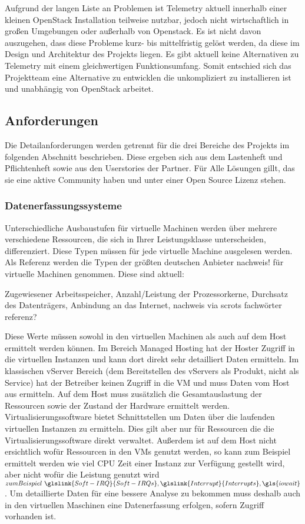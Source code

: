 Aufgrund der langen Liste an Problemen ist Telemetry aktuell innerhalb einer
kleinen OpenStack Installation teilweise nutzbar, jedoch nicht wirtschaftlich
in großen Umgebungen oder außerhalb von Openstack. Es ist nicht davon
auszugehen, dass diese Probleme kurz- bis mittelfristig gelöst werden, da diese
im Design und Architektur des Projekts liegen. Es gibt aktuell keine
Alternativen zu Telemetry mit einem gleichwertigen Funktionsumfang. Somit
entschied sich das Projektteam eine Alternative zu entwicklen die unkompliziert
zu installieren ist und unabhängig von OpenStack arbeitet.
\tm%

\subsection{Anforderungen}
Die Detailanforderungen werden getrennt für die drei Bereiche des Projekts im
folgenden Abschnitt beschrieben. Diese ergeben sich aus dem Lastenheft und
Pflichtenheft sowie aus den Userstories der Partner. Für Alle Lösungen gillt,
das sie eine aktive Community haben und unter einer Open Source Lizenz stehen.
\tm%

\subsubsection{Datenerfassungssysteme}
\label{subsubsection:datenerfassungssysteme}
Unterschiedliche Ausbaustufen für virtuelle Machinen werden über mehrere
verschiedene Ressourcen, die sich in Ihrer Leistungsklasse unterscheiden,
differenziert. Diese Typen müssen für jede virtuelle Machine ausgelesen werden.
Als Referenz werden die Typen der größten deutschen Anbieter nachweis! für
virtuelle Machinen genommen. Diese sind aktuell:

Zugewiesener Arbeitsspeicher, Anzahl/Leistung der Prozessorkerne, Durchsatz des
Datenträgers, Anbindung an das Internet, nachweis via scrots fachwörter
referenz?

Diese Werte müssen sowohl in den virtuellen Machinen als auch auf dem Host
ermittelt werden können. Im Bereich Managed Hosting hat der Hoster Zugriff in
die virtuellen Instanzen und kann dort direkt sehr detailliert Daten ermitteln.
Im klassischen vServer Bereich (dem Bereitstellen des vServers als Produkt,
nicht als Service) hat der Betreiber keinen Zugriff in die VM und muss Daten
vom Host aus ermitteln. Auf dem Host muss zusätzlich die Gesamtauslastung der
Ressourcen sowie der Zustand der Hardware ermittelt werden.
Virtualisierungssoftware bietet Schnittstellen um Daten über die laufenden
virtuellen Instanzen zu ermitteln. Dies gilt aber nur für Ressourcen die die
Virtualisierungssoftware direkt verwaltet. Außerdem ist auf dem Host nicht
ersichtlich wofür Ressourcen in den VMs genutzt werden, so kann zum Beispiel
ermittelt werden wie viel CPU Zeit einer Instanz zur Verfügung gestellt wird,
aber nicht wofür die Leistung genutzt wird \( zum
Beispiel~\glslink{Soft-IRQ}{Soft-IRQs}, \glslink{Interrupt}{Interrupts},
\gls{iowait}\). Um detaillierte Daten für eine bessere Analyse zu bekommen muss
deshalb auch in den virtuellen Maschinen eine Datenerfassung erfolgen, sofern
Zugriff vorhanden ist.


